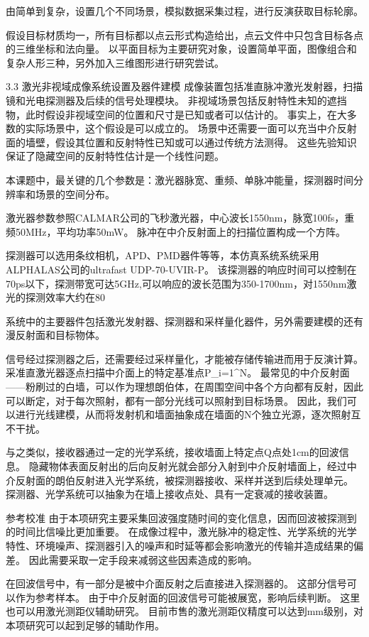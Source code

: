 由简单到复杂，设置几个不同场景，模拟数据采集过程，进行反演获取目标轮廓。

假设目标材质均一，所有目标都以点云形式构造给出，点云文件中只包含目标各点的三维坐标和法向量。
以平面目标为主要研究对象，设置简单平面，图像组合和复杂人形三种，另外加入三维图形进行研究尝试。

3.3  激光非视域成像系统设置及器件建模
成像装置包括准直脉冲激光发射器，扫描镜和光电探测器及后续的信号处理模块。
非视域场景包括反射特性未知的遮挡物，此时假设非视域空间的位置和尺寸是已知或者可以估计的。
事实上，在大多数的实际场景中，这个假设是可以成立的。
场景中还需要一面可以充当中介反射面的墙壁，假设其位置和反射特性已知或可以通过传统方法测得。
这些先验知识保证了隐藏空间的反射特性估计是一个线性问题。

本课题中，最关键的几个参数是：激光器脉宽、重频、单脉冲能量，探测器时间分辨率和场景的空间分布。

激光器参数参照CALMAR公司的飞秒激光器，中心波长1550nm，脉宽100fs，重频50MHz，平均功率50mW。
脉冲在中介反射面上的扫描位置构成一个方阵。

探测器可以选用条纹相机，APD、PMD器件等等，本仿真系统系统采用ALPHALAS公司的ultrafast UDP-70-UVIR-P。
该探测器的响应时间可以控制在70ps以下，探测带宽可达5GHz,可以响应的波长范围为350-1700nm，对1550nm激光的探测效率大约在80%

系统中的主要器件包括激光发射器、探测器和采样量化器件，另外需要建模的还有漫反射面和目标物体。

信号经过探测器之后，还需要经过采样量化，才能被存储传输进而用于反演计算。
采准直激光器逐点扫描中介面上的特定基准点{{P}}_{i=1}^N。
最常见的中介反射面——粉刷过的白墙，可以作为理想朗伯体，在周围空间中各个方向都有反射，因此可以断定，对于每次照射，都有一部分光线可以照射到目标场景。
因此，我们可以进行光线建模，从而将发射机和墙面抽象成在墙面的N个独立光源，逐次照射互不干扰。

与之类似，接收器通过一定的光学系统，接收墙面上特定点Q点处1cm的回波信息。
隐藏物体表面反射出的后向反射光就会部分入射到中介反射墙面上，经过中介反射面的朗伯反射进入光学系统，被探测器接收、采样并送到后续处理单元。
探测器、光学系统可以抽象为在墙上接收点处、具有一定衰减的接收装置。

参考校准
由于本项研究主要采集回波强度随时间的变化信息，因而回波被探测到的时间比信噪比更加重要。
在成像过程中，激光脉冲的稳定性、光学系统的光学特性、环境噪声、探测器引入的噪声和时延等都会影响激光的传输并造成结果的偏差。
因此需要采取一定手段来减弱这些因素造成的影响。

在回波信号中，有一部分是被中介面反射之后直接进入探测器的。
这部分信号可以作为参考样本。
由于中介反射面的回波信号可能被展宽，影响后续判断。
这里也可以用激光测距仪辅助研究。
目前市售的激光测距仪精度可以达到mm级别，对本项研究可以起到足够的辅助作用。

